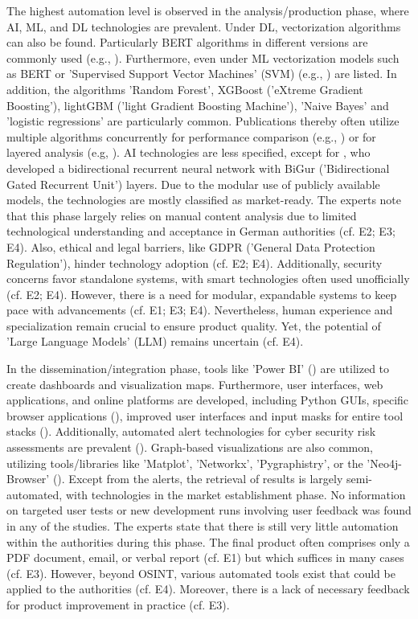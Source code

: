 \documentclass[10pt]{article}
\begin{document}
The highest automation level is observed in the analysis/production phase, where AI, ML, and DL technologies are prevalent.
Under DL, vectorization algorithms can also be found. Particularly BERT algorithms in different versions are commonly used
(e.g., \cite{Ma.2022}). Furthermore, even under ML vectorization models such as BERT or
'Supervised Support Vector Machines' (SVM) (e.g., \cite{Iorga.2020}) are listed.
In addition, the algorithms 'Random Forest', XGBoost ('eXtreme Gradient Boosting'),
lightGBM ('light Gradient Boosting Machine'), 'Naive Bayes' and 'logistic regressions' are particularly common.
Publications thereby often utilize multiple algorithms concurrently for performance comparison (e.g., \cite{Tao.2023})
or for layered analysis (e.g, \cite{Yang.2022}). AI technologies are less specified,
except for \textcite{Dale.2023}, who developed a bidirectional recurrent neural network with
BiGur ('Bidirectional Gated Recurrent Unit') layers. Due to the modular use of publicly available models,
the technologies are mostly classified as market-ready. The experts note that this phase largely relies
on manual content analysis due to limited technological understanding and acceptance in German authorities
(cf. E2; E3; E4). Also, ethical and legal barriers, like GDPR ('General Data Protection Regulation'), hinder technology
adoption (cf. E2; E4). Additionally, security concerns favor standalone systems,
with smart technologies often used unofficially (cf. E2; E4). However, there is a need for modular,
expandable systems to keep pace with advancements (cf. E1; E3; E4). Nevertheless, human experience
and specialization remain crucial to ensure product quality. Yet, the potential of 'Large Language Models' (LLM) remains uncertain (cf. E4).

In the dissemination/integration phase, tools like 'Power BI' (\cite{Tao.2023})
are utilized to create dashboards and visualization maps. Furthermore, user interfaces,
web applications, and online platforms are developed, including Python GUIs,
specific browser applications (\cite{Elmas.2022}),
improved user interfaces and input masks for entire tool stacks (\cite{Arjun.2020}).
Additionally, automated alert technologies for cyber security risk assessments are prevalent (\cite{Ahuja.2022}). Graph-based visualizations are also common, utilizing tools/libraries like 'Matplot', 'Networkx', 'Pygraphistry', or the 'Neo4j-Browser' (\cite{Middleton.2020}).
Except from the alerts, the retrieval of results is largely semi-automated, with technologies in the market establishment phase. No information on targeted user tests or new development runs involving user feedback was found in any of the studies. The experts state that there is still very little
automation within the authorities during this phase. The final product often comprises only a PDF document, email, or verbal report (cf. E1) but which suffices in many cases (cf. E3).
However, beyond OSINT, various automated tools exist that could be applied to the authorities (cf. E4). Moreover, there is a lack of necessary feedback for product improvement in practice (cf. E3).
\end{document}
